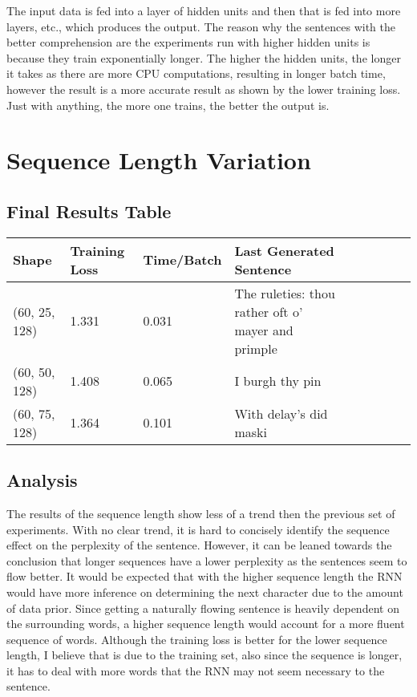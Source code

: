 \documentclass[a4paper]{article}
\begin{document}
    The input data is fed into a layer of hidden units and then that is fed into more layers, etc., which produces the output. The reason why the sentences with the better comprehension are the experiments run with higher hidden units is because they train exponentially longer. The higher the hidden units, the longer it takes as there are more CPU computations, resulting in longer batch time, however the result is a more accurate result as shown by the lower training loss. Just with anything, the more one trains, the better the output is. 

\section{Sequence Length Variation}
\subsection{Final Results Table}
\begin{tabular}{l*{8}l}
Shape  & Training Loss & Time/Batch & Last Generated Sentence\\
\hline
(60, 25, 128)	& 1.331 & 0.031 & The ruleties: thou rather oft o' mayer and primple \\
(60, 50, 128)	& 1.408 & 0.065 & I burgh thy pin \\
(60, 75, 128)	& 1.364 & 0.101 & With delay's did maski \\

\end{tabular}


\subsection{Analysis}

    The results of the sequence length show less of a trend then the previous set of experiments. With no clear trend, it is hard to concisely identify the sequence effect on the perplexity of the sentence. However, it can be leaned towards the conclusion that longer sequences have a lower perplexity as the sentences seem to flow better. It would be expected that with the higher sequence length the RNN would have more inference on determining the next character due to the amount of data prior. Since getting a naturally flowing sentence is heavily dependent on the surrounding words, a higher sequence length would account for a more fluent sequence of words. Although the training loss is better for the lower sequence length, I believe that is due to the training set, also since the sequence is longer, it has to deal with more words that the RNN may not seem necessary to the sentence. 
\end{document}
